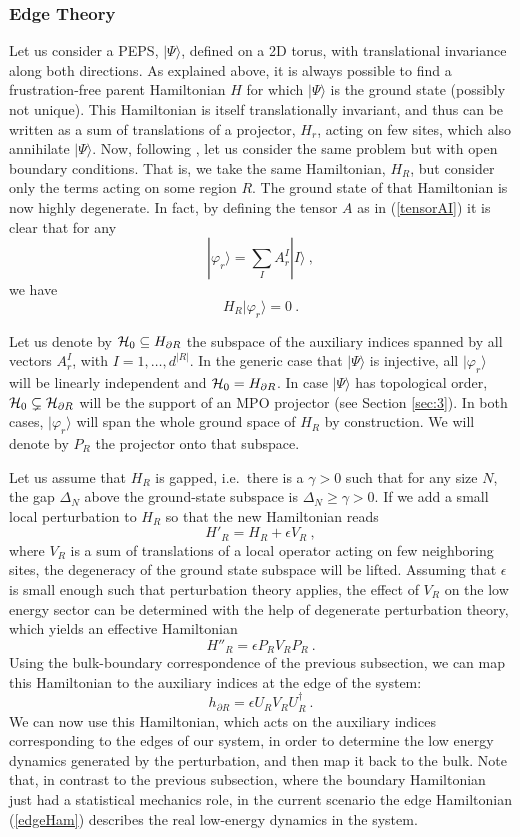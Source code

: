 \documentclass[rmp,aps,reprint,superscriptaddress,nobalancelastpage]{revtex4-1}
\newcommand{\be}{\begin{equation}}
\newcommand{\ee}{\end{equation}}
\newcommand{\ket}[1]{\vert#1\rangle}
\begin{document}
\subsubsection{Edge Theory}\label{edgetheory}

Let us consider a PEPS, $\ket\Psi$, defined on a 2D torus, with translational invariance along both directions. As explained above, it is always possible to find a
frustration-free parent  Hamiltonian $H$ for which $\ket\Psi$ is the ground state (possibly not unique). This Hamiltonian is itself translationally invariant, and thus can be written as a sum of translations of a projector, $H_r$, acting on few sites, which also annihilate $\ket\Psi$. Now, following \citet{yang:peps-edgetheories}, let us consider the same problem but with open boundary conditions. That is, we take the same Hamiltonian, $H_R$, but consider only the terms acting on some region $R$. The ground state of that Hamiltonian is now highly degenerate. In fact, by defining the tensor $A$ as in (\ref{tensorAI}) it is clear that for any
\be
    |\varphi_r\rangle = \sum_I A^I_r |I\rangle\ ,
\ee
we have
\be
    H_R |\varphi_r\rangle =0\ .
\ee

Let us denote by ${\cal H}_0\subseteq H_{\partial R}$ the subspace of the auxiliary indices spanned by all vectors $A^I_r$, with $I=1,\ldots, d^{|R|}$. In the generic case that $\ket\Psi$ is injective, all $\ket{\varphi_r}$ will be linearly independent and ${\cal H}_0= H_{\partial R}$. In case $\ket\Psi$ has topological order,
${\cal H}_0\subsetneq \mathcal H_{\partial R}$ will be the support of an MPO projector (see Section \ref{sec:3}). In both cases, $\ket{\varphi_r}$ will span the whole ground space of $H_R$ by construction. We will denote by $P_R$ the projector onto that subspace.

Let us assume that $H_R$ is gapped, i.e.\ there is a $\gamma>0$ such that for any size $N$, the gap $\Delta_N$ above the ground-state subspace is $\Delta_N\ge\gamma>0$. If we add a small local perturbation to $H_R$ so that the new Hamiltonian reads
\be
    H'_R = H_R + \epsilon V_R\ ,
\ee
where $V_R$ is a sum of translations of a local operator acting on few neighboring sites, the degeneracy of the ground state subspace will be lifted. Assuming that $\epsilon$ is small enough such that perturbation theory applies, the effect of $V_R$ on the low energy sector can be determined with the help of degenerate perturbation theory, which yields an effective Hamiltonian
\be
    H''_R = \epsilon P_R V_R P_R\ .
\ee
Using the bulk-boundary correspondence of the previous subsection, we can map this Hamiltonian
to the auxiliary indices at the edge of the system:
\be
    \label{edgeHam}
    h_{\partial R} = \epsilon U_R V_R U_R^\dagger\ .
\ee
We can now use this Hamiltonian, which acts on the auxiliary indices corresponding to the edges of our system, in order to determine the low energy dynamics generated by the perturbation, and then map it back to the bulk. Note that, in contrast to the previous subsection, where the boundary Hamiltonian just had a statistical mechanics role, in the current scenario the edge Hamiltonian (\ref{edgeHam}) describes the real low-energy dynamics in the system.
\end{document}

